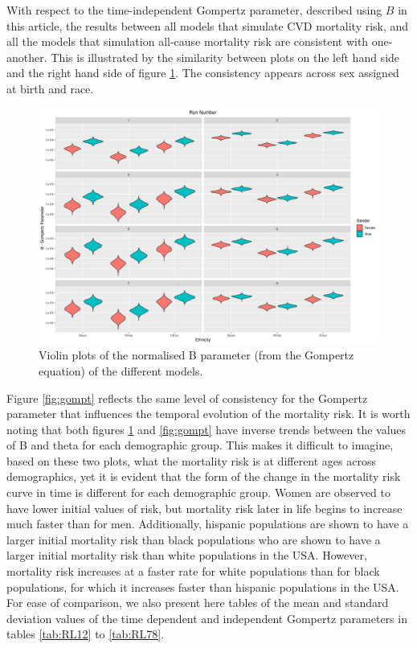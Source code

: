 \documentclass[
]{article}
\begin{document}
With respect to the time-independent Gompertz parameter, described using \(B\) in this article, the results between all models that simulate CVD mortality risk, and all the models that simulation all-cause mortality risk are consistent with one-another. This is illustrated by the similarity between plots on the left hand side and the right hand side of figure \ref{fig:gompB}. The consistency appears across sex assigned at birth and race.

\begin{figure}
\hypertarget{fig:gompB}{%
\centering
\includegraphics{./Plots/gompertz/B_parameter.png}
\caption{Violin plots of the normalised B parameter (from the Gompertz equation) of the different models.}\label{fig:gompB}
}
\end{figure}

Figure \ref{fig:gompt} reflects the same level of consistency for the Gompertz parameter that influences the temporal evolution of the mortality risk. It is worth noting that both figures \ref{fig:gompB} and \ref{fig:gompt} have inverse trends between the values of B and theta for each demographic group. This makes it difficult to imagine, based on these two plots, what the mortality risk is at different ages across demographics, yet it is evident that the form of the change in the mortality risk curve in time is different for each demographic group. Women are observed to have lower initial values of risk, but mortality risk later in life begins to increase much faster than for men. Additionally, hispanic populations are shown to have a larger initial mortality risk than black populations who are shown to have a larger initial mortality risk than white populations in the USA. However, mortality risk increases at a faster rate for white populations than for black populations, for which it increases faster than hispanic populations in the USA. For ease of comparison, we also present here tables of the mean and standard deviation values of the time dependent and independent Gompertz parameters in tables \ref{tab:RL12} to \ref{tab:RL78}.
\end{document}
